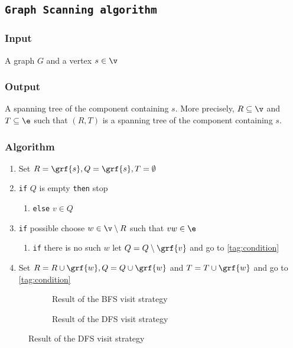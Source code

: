 \subsection{\texttt{Graph Scanning algorithm}}
\subsubsection{Input}
A graph $G$ and a vertex $s \in \v$
\subsubsection{Output}
A spanning tree of the component containing $s$. More precisely, $R \subseteq \v$ and $T \subseteq \e$ such that $(R, T)$ is a spanning tree of the component containing $s$.
\subsubsection{Algorithm}
\begin{enumerate}
    \item Set $R = \grf{s}, Q = \grf{s}, T = \emptyset$
    \item \label{tag:condition} \texttt{if} $Q$ is empty \texttt{then} stop
    \begin{enumerate}
        \item \texttt{else} $v \in Q$
    \end{enumerate}
    \item \texttt{if} possible choose $w \in \v \setminus R$ such that $vw \in \e$
    \begin{enumerate}
        \item \texttt{if} there is no such $w$ let $Q = Q \setminus \grf{v}$ and go to \ref{tag:condition}
    \end{enumerate}
    \item Set $R = R \cup \grf{w}, Q = Q \cup \grf{w}$ and $T = T \cup \grf{w}$ and go to \ref{tag:condition}
\end{enumerate}
\begin{figure}
    \centering
    \begin{subfigure}[t]{0.45\textwidth}
        
        \caption{Result of the BFS visit strategy}
    \end{subfigure}
    \hfill
    \begin{subfigure}[t]{0.45\textwidth}
        
        \caption{Result of the DFS visit strategy}
    \end{subfigure}
    \label{fig:graph_scanning_algorithm}
\end{figure}
